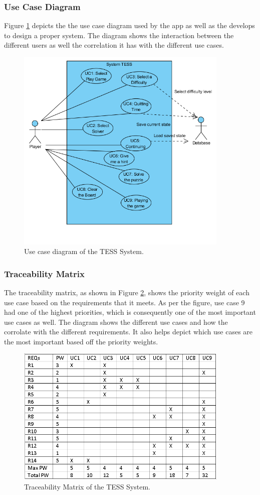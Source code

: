 \documentclass{article}
\begin{document}
\subsubsection{Use Case Diagram}
Figure \ref{fig:usecasediagram} depicts the the use case diagram used by the app as well as the develops to design a proper system. The diagram shows the interaction between the different users as well the correlation it has with the different use cases.
\begin{figure}[h!]\centering
	\includegraphics[width=4.0in]{./Figure/Usecase_Diagram.PNG}
	\caption{Use case diagram of the TESS System.}\label{fig:usecasediagram}
\end{figure}

\subsubsection{Traceability Matrix}
The traceability matrix, as shown in Figure \ref{fig:traceabilitymatrix}, shows the priority weight of each use case based on the requirements that it meets. As per the figure, use case 9 had one of the highest priorities, which is consequently one of the most important use cases as well. The diagram shows the different use cases and how the corrolate with the different requirements. It also helps depict which use cases are the most important based off the priority weights.
\begin{figure}[h!]\centering
\includegraphics[width=4.0in]{./Figure/Traceability_Matrix.PNG}
\caption{Traceability Matrix of the TESS System.}\label{fig:traceabilitymatrix}
\end{figure}
\end{document}
